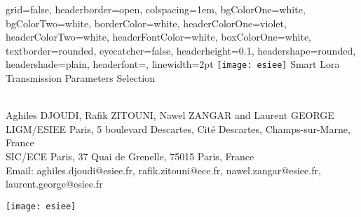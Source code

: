 \begin{poster}{
    grid=false,
    headerborder=open,           %
    colspacing=1em,              %
    bgColorOne=white,            %
    bgColorTwo=white,            %
    borderColor=white,           %
    headerColorOne=violet,       %
    headerColorTwo=white,        %
    headerFontColor=white,       %
    boxColorOne=white,           %
    textborder=rounded,          %
    eyecatcher=false,            %
    headerheight=0.1\textheight, %
    headershape=rounded,         %
    headershade=plain,
    headerfont=\Large\textsf,    %
    linewidth=2pt                %
}{
    \texttt{[image: esiee]}
}{
   \textsf{Smart Lora Transmission Parameters Selection}
}{
    \sf\vspace{0.2em}\\
    Aghiles DJOUDI, Rafik ZITOUNI, Nawel ZANGAR and Laurent GEORGE
    \vspace{0.3em}\\
    \small{
        LIGM/ESIEE Paris, 5 boulevard Descartes, Cité Descartes, Champs-sur-Marne, France\\
        SIC/ECE Paris, 37 Quai de Grenelle, 75015 Paris, France
        \vspace{0.3em}\\
    }
    Email:   aghiles.djoudi@esiee.fr, rafik.zitouni@ece.fr, nawel.zangar@esiee.fr, laurent.george@esiee.fr

}{
    \texttt{[image: esiee]}
}



\end{poster}
